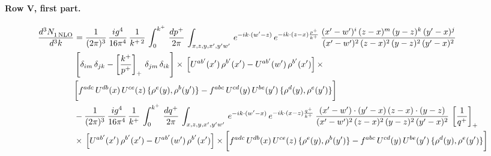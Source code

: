 \documentclass[10pt]{article}
\numberwithin{equation}{section}
\begin{document}
\paragraph{Row V, first part.}
\begin{align}
     \frac{d^{3}N_{1\,\rm NLO}^{\rm}}{d^{3}k}  & =  \frac{1}{(2\pi)^{3}}\, \frac{ig^{4}}{16\pi^{4}}\, \frac{1}{k^{+\,2}}\,\int_{0}^{k^{+}}\, \frac{dp^{+}}{2\pi}\,\int_{x,z,y,x',y'w'}\,e^{-ik\cdot (w^\prime-z)}\,e^{-ik\cdot (z-x)\frac{p^{+}}{k^{+}}}\,\frac{(x'-w')^{i}\,(z-x)^{m}\,(y-z)^{k}\,(y'-x)^{j}}{(x'-w')^{2}\,(z-x)^{2}\,(y-z)^{2}\,(y'-x)^{2}}\,\notag \\ & \left[\delta_{im}\,\delta_{jk}-\left[\frac{k^{+}}{p^{+}}\right]_{+}\, \delta_{jm}\,\delta_{ik}\right]\times\, \left[U^{ab'}(x')\,\rho^{b'}(x')-U^{ab'}(w')\,\rho^{b'}(x')\right]\times\notag \\ & \bigg[f^{adc}\,U^{db}(x)\,U^{ce}(z)\, \{\rho^{e}(y),\rho^{b}(y')\}-f^{abc}\,U^{cd}(y)\,U^{be}(y')\, \{\rho^{d}(y),\rho^{e}(y')\}\bigg] \notag \\
& -\frac{1}{(2\pi)^{3}}\, \frac{ig^{4}}{16\pi^{4}}\, \frac{1}{k^{+}}\,\int_{0}^{k^{+}}\, \frac{dq^{+}}{2\pi}\,\int_{x,z,y,x',y'w'}\,e^{-ik\cdot (w^\prime-x)}\,e^{-ik\cdot (x-z)\frac{q^{+}}{k^{+}}}\,\frac{(x'-w')\cdot (y'-x)\,(z-x)\cdot (y-z)}{(x'-w')^{2}\,(z-x)^{2}\,(y-z)^{2}\,(y'-x)^{2}}\,\left[\frac{1}{q^{+}}\right]_{+}\notag \\ & \times\, \left[U^{ab'}(x')\,\rho^{b'}(x')-U^{ab'}(w')\,\rho^{b'}(x')\right]\times \bigg[f^{adc}\,U^{db}(x)\,U^{ce}(z)\, \{\rho^{e}(y),\rho^{b}(y')\}-f^{abc}\,U^{cd}(y)\,U^{be}(y')\, \{\rho^{d}(y),\rho^{e}(y')\}\bigg] \label{eq:F:G1V1}
\end{align}
\end{document}
